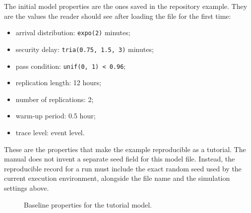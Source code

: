 The initial model properties are the ones saved in the repository example.
They are the values the reader should see after loading the file for the first
time:

\begin{itemize}
\item arrival distribution: \texttt{expo(2)} minutes;
\item security delay: \texttt{tria(0.75, 1.5, 3)} minutes;
\item pass condition: \texttt{unif(0, 1) < 0.96};
\item replication length: 12 hours;
\item number of replications: 2;
\item warm-up period: 0.5 hour;
\item trace level: event level.
\end{itemize}

These are the properties that make the example reproducible as a tutorial. The
manual does not invent a separate seed field for this model file. Instead, the
reproducible record for a run must include the exact random seed used by the
current execution environment, alongside the file name and the simulation
settings above.

\begin{figure}[htbp]
\centering
\caption{Baseline properties for the tutorial model.}
\label{fig:first-model-properties}
\end{figure}


